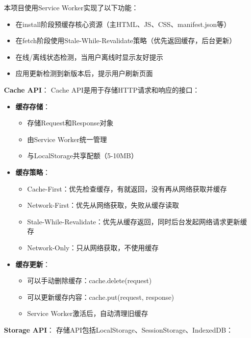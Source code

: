 \documentclass[12pt,a4paper]{article}
\begin{document}
本项目使用Service Worker实现了以下功能：
\begin{itemize}
    \item 在install阶段预缓存核心资源（主HTML、JS、CSS、manifest.json等）
    \item 在fetch阶段使用Stale-While-Revalidate策略（优先返回缓存，后台更新）
    \item 在线/离线状态检测，当用户离线时显示友好提示
    \item 应用更新检测到新版本后，提示用户刷新页面
\end{itemize}

\textbf{Cache API}：
Cache API是用于存储HTTP请求和响应的接口：

\begin{itemize}
    \item \textbf{缓存存储}：
        \begin{itemize}
            \item 存储Request和Response对象
            \item 由Service Worker统一管理
            \item 与LocalStorage共享配额（5-10MB）
        \end{itemize}
    \item \textbf{缓存策略}：
        \begin{itemize}
            \item Cache-First：优先检查缓存，有就返回，没有再从网络获取并缓存
            \item Network-First：优先从网络获取，失败从缓存读取
            \item Stale-While-Revalidate：优先从缓存返回，同时后台发起网络请求更新缓存
            \item Network-Only：只从网络获取，不使用缓存
        \end{itemize}
    \item \textbf{缓存更新}：
        \begin{itemize}
            \item 可以手动删除缓存：cache.delete(request)
            \item 可以更新缓存内容：cache.put(request, response)
            \item Service Worker激活后，自动清理旧缓存
        \end{itemize}
\end{itemize}

\textbf{Storage API}：
存储API包括LocalStorage、SessionStorage、IndexedDB：
\end{document}
